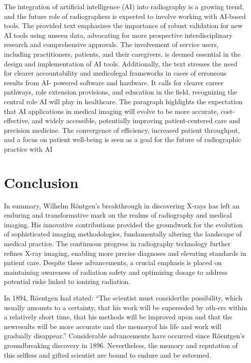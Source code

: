 \documentclass[a4paper,12pt]{report}
\begin{document}
The integration of artificial intelligence (AI) into radiography is a growing trend, and the
future role of radiographers is expected to involve working with AI-based tools. The provided
text emphasizes the importance of robust validation for new AI tools using unseen data,
advocating for more prospective interdisciplinary research and comprehensive approvals. The
involvement of service users, including practitioners, patients, and their caregivers, is deemed
essential in the design and implementation of AI tools. Additionally, the text stresses the need
for clearer accountability and medicolegal frameworks in cases of erroneous results from AI-
powered software and hardware. It calls for clearer career pathways, role extension provisions,
and education in the field, recognizing the central role AI will play in healthcare. The paragraph
highlights the expectation that AI applications in medical imaging will evolve to be more
accurate, cost-effective, and widely accessible, potentially improving patient-centered care and
precision medicine. The convergence of efficiency, increased patient throughput, and a focus
on patient well-being is seen as a goal for the future of radiographic practice with AI

\chapter{Conclusion}

In summary, Wilhelm Röntgen's breakthrough in discovering X-rays has left an enduring and
transformative mark on the realms of radiography and medical imaging. His innovative
contributions provided the groundwork for the evolution of sophisticated imaging
methodologies, fundamentally altering the landscape of medical practice. The continuous
progress in radiography technology further refines X-ray imaging, enabling more precise
diagnoses and elevating standards in patient care. Despite these advancements, a crucial
emphasis is placed on maintaining awareness of radiation safety and optimizing dosage to
address potential risks linked to ionizing radiation.

In 1894, Röentgen had stated: “The scientist must considerthe possibility, which usually amounts
to a certainty, that his work will be superseded by oth-ers within a relatively short time, that his
methods will be improved upon and that the newresults will be more accurate and the memoryof his
life and work will gradually disappear.” Considerable advancements have occurred since
Röentgen's groundbreaking discovery in 1896. Nevertheless, the memory and reputation of this
selfless and gifted scientist are bound to endure and be esteemed.


\printbibheading

\printbibliography[type=book,heading=subbibliography,title={Books}]
\printbibliography[type=article, heading=subbibliography, title={Articles}]
\printbibliography[type=online,heading=subbibliography, title={Online Resources}]
\printbibliography[type=misc, heading=subbibliography, title={Other Documents}]
\listoffigures
\end{document}
